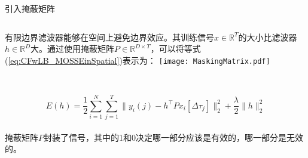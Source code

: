 \begin{frame}{引入掩蔽矩阵}

\begin{columns}
\centering
{}
\setlength{\parindent}{2\ccwd}

    有限边界滤波器能够在空间上避免边界效应。其训练信号$x\in \mathbb{R}^T$的大小比滤波器$h\in\mathbb{R}^D$大。通过使用掩蔽矩阵$P\in \mathbb{R}^{D\times T}$，可以将等式(\ref{eq:CFwLB_MOSSEinSpatial})表示为：
   \texttt{[image: MaskingMatrix.pdf]}
\end{columns} 
~\\
\begin{equation}
    E(h)= \frac{1}{2}\sum_{i=1}^N\sum_{j=1}^T\|y_i(j)-h^\top Px_i[\Delta\tau_j]\|_2^2 + \frac{\lambda}{2}\|h\|_2^2
    \label{eq:CFwLB_MOSSEinSpatialwithMaskingMatix}
\end{equation}
~\\
掩蔽矩阵$P$封装了信号，其中的1和0决定哪一部分应该是有效的，哪一部分是无效的。

\end{frame}

